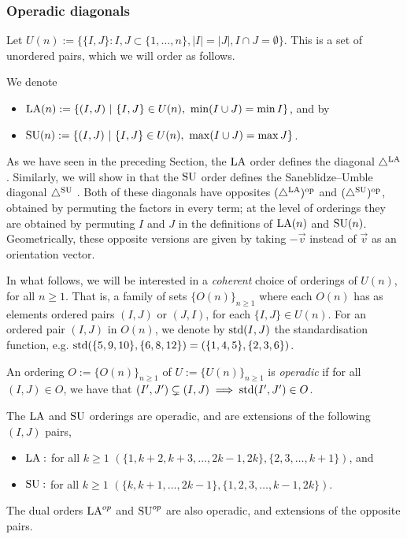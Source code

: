 



\subsubsection{Operadic diagonals}

Let $U(n) := \{ \{I,J\}:I,J \subset \{1,\dots,n\}, |I|= |J|, I\cap J = \emptyset \}$.
This is a set of unordered pairs, which we will order as follows. 

\begin{definition}
We denote 
\begin{itemize} 
    \item $\mathrm{LA}(n):=\{(I,J) \ | \ \{I,J\} \in U(n), \ \min(I\cup J) = \min I\}$, and by 
    \item $\mathrm{SU}(n):=\{(I,J) \ | \ \{I,J\} \in U(n), \ \max(I\cup J) = \max J\}$.
\end{itemize}
\end{definition}

As we have seen in the preceding Section, the $\mathrm{LA}$ order defines the diagonal $\triangle^{\mathrm{LA}}$. 
Similarly, we will show in  that the $\mathrm{SU}$ order defines the Saneblidze--Umble diagonal $\triangle^{\mathrm{SU}}$ \cite{SaneblidzeUmble04}.
Both of these diagonals have opposites $(\triangle^{\mathrm{LA}})^{\mathrm{op}}$ and $(\triangle^{\mathrm{SU}})^{\mathrm{op}}$, obtained by permuting the factors in every term; at the level of orderings they are obtained by permuting $I$ and $J$ in the definitions of $\mathrm{LA}(n)$ and $\mathrm{SU}(n)$. 
Geometrically, these opposite versions are given by taking $-\vec v$ instead of $\vec v$ as an orientation vector. 

In what follows, we will be interested in a \emph{coherent} choice of orderings of $U(n)$, for all $n \geq 1$.
That is, a family of sets $\{O(n)\}_{n\geq 1}$ where each $O(n)$ has as elements ordered pairs $(I,J)$ or $(J,I)$, for each $\{I,J\} \in U(n)$.
For an ordered pair $(I,J)$ in $O(n)$, we denote by $\operatorname{std}(I,J)$ the standardisation function, e.g. $\operatorname{std}(\{5,9,10\},\{6,8,12\}) = (\{1,4,5\},\{2,3,6\})$.

\begin{definition}
An ordering $O:=\{O(n)\}_{n \geq 1}$ of $U:=\{U(n)\}_{n\geq 1}$ is \emph{operadic} if for all $(I,J) \in O$, we have that $(I',J') \subsetneq (I,J) \implies \operatorname{std}(I',J') \in O$. 
\end{definition}

\begin{lemma} \label{lem:operadic-ordering}
The $\mathrm{LA}$ and $\mathrm{SU}$ orderings are operadic, and are extensions of the following $(I,J)$ pairs,
\begin{itemize}
    \item $\mathrm{LA} :$ for all $k\geq 1$  $(\{1,k+2,k+3,\dots,2k-1,2k\}, \{2,3,\dots,k+1\})$, and 
    \item $\mathrm{SU} :$ for all $k\geq 1$  $(\{k,k+1,\dots,2k-1\},\{1,2,3,\dots,k-1,2k\})$. 
\end{itemize}
The dual orders $\mathrm{LA}^{op}$ and $\mathrm{SU}^{op}$ are also operadic, and extensions of the opposite pairs.
\end{lemma}

